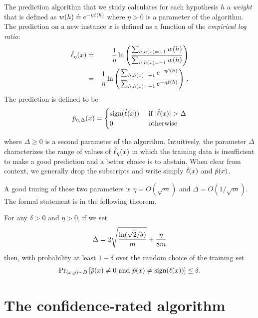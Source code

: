 \documentclass{article}
\begin{document}
The prediction algorithm that we study calculates for each hypothesis
$h$ a {\em weight} that is defined as
$
w(h) \doteq e^{-\eta \hat{\varepsilon}(h)}
$
where $\eta>0$ is a parameter of the algorithm.
The prediction on a new instance $x$ is defined as a function of the
{\em empirical log ratio}:
\begin{eqnarray*}
\hat{\ell}_\eta(x) &\doteq &
{1 \over \eta}
\ln
{\left({\sum_{h, h(x)=+1} w(h)
 \over
 \sum_{h, h(x)=-1} w(h)
}\right)}\\
&=&
{1 \over \eta}
\ln
{\left({\sum_{h, h(x)=+1} e^{-\eta \hat{\varepsilon}(h)}
 \over
 \sum_{h, h(x)=-1} e^{-\eta \hat{\varepsilon}(h)}
}\right)}
~.
\end{eqnarray*} 
The prediction is defined to be
\begin{equation}  \label{eqn:prediction}
\pempir_{\eta,\Delta}(x) = 
\begin{cases}
\sign(\lempir(x))& \mbox{ if } |\lempir(x)|>\Delta \cr 
0 & \mbox{ otherwise }
\end{cases}
\end{equation}

where $\Delta \geq 0$ is a second parameter of the
algorithm.
Intuitively, the parameter $\Delta$ characterizes the range
of values of $\hat{\ell}_\eta(x)$ in which the training data is insufficient
to make a good prediction and a better choice is to abstain.
When clear from context, we generally drop the subscripts and write
simply $\hat{\ell}(x)$ and $\hat{p}(x)$.

A good tuning of these two parameters is $\eta = O(\sqrt{m})$ and
$\Delta = O(1/\sqrt{m})$. The formal statement is in the following theorem.

\begin{theorem}  \label{thm:1}
For any $\delta>0$ and $\eta>0$, if we set 
\[
\Delta = 2\sqrt{\ln(\sqrt{2}/\delta) \over m} + {\eta \over 8m}
\]
then, with probability at least $1-\delta$ over the random 
choice of the training set
\[
\mbox{Pr}_{(x,y) \sim D}\left[ \hat{p}(x) \neq 0 \mbox{\rm ~and~}  
\hat{p}(x) \neq \mbox{\rm sign}(\ell(x)) \right] \leq \delta.
\]
\end{theorem}

\fi

\section{The confidence-rated algorithm}
\end{document}
